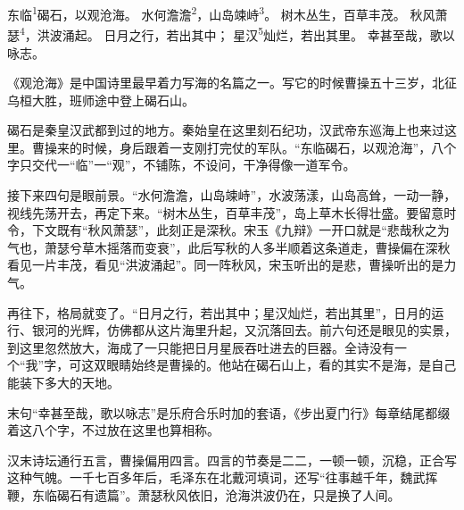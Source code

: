 
\begin{poem}
东临\textsuperscript{1}碣石，以观沧海。
水何澹澹\textsuperscript{2}，山岛竦峙\textsuperscript{3}。
树木丛生，百草丰茂。
秋风萧瑟\textsuperscript{4}，洪波涌起。
日月之行，若出其中；
星汉\textsuperscript{5}灿烂，若出其里。
幸甚至哉，歌以咏志。
\end{poem}

\begin{annotations}
\end{annotations}

\begin{appreciation}
《观沧海》是中国诗里最早着力写海的名篇之一。写它的时候曹操五十三岁，北征乌桓大胜，班师途中登上碣石山。

碣石是秦皇汉武都到过的地方。秦始皇在这里刻石纪功，汉武帝东巡海上也来过这里。曹操来的时候，身后跟着一支刚打完仗的军队。“东临碣石，以观沧海”，八个字只交代一“临”一“观”，不铺陈，不设问，干净得像一道军令。

接下来四句是眼前景。“水何澹澹，山岛竦峙”，水波荡漾，山岛高耸，一动一静，视线先荡开去，再定下来。“树木丛生，百草丰茂”，岛上草木长得壮盛。要留意时令，下文既有“秋风萧瑟”，此刻正是深秋。宋玉《九辩》一开口就是“悲哉秋之为气也，萧瑟兮草木摇落而变衰”，此后写秋的人多半顺着这条道走，曹操偏在深秋看见一片丰茂，看见“洪波涌起”。同一阵秋风，宋玉听出的是悲，曹操听出的是力气。

再往下，格局就变了。“日月之行，若出其中；星汉灿烂，若出其里”，日月的运行、银河的光辉，仿佛都从这片海里升起，又沉落回去。前六句还是眼见的实景，到这里忽然放大，海成了一只能把日月星辰吞吐进去的巨器。全诗没有一个“我”字，可这双眼睛始终是曹操的。他站在碣石山上，看的其实不是海，是自己能装下多大的天地。

末句“幸甚至哉，歌以咏志”是乐府合乐时加的套语，《步出夏门行》每章结尾都缀着这八个字，不过放在这里也算相称。

汉末诗坛通行五言，曹操偏用四言。四言的节奏是二二，一顿一顿，沉稳，正合写这种气魄。一千七百多年后，毛泽东在北戴河填词，还写“往事越千年，魏武挥鞭，东临碣石有遗篇”。萧瑟秋风依旧，沧海洪波仍在，只是换了人间。
\end{appreciation}
